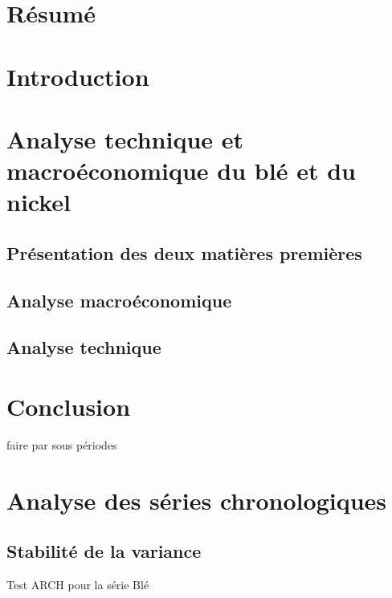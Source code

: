 \documentclass[12pt,a4paper]{article}
\begin{document}
\clearpage
{}
\pagestyle{fancy}
\fancyhead{}\fancyfoot[C]{\thepage}
\section*{Résumé}
\setcounter{tocdepth}{6}
\renewcommand\contentsname{Sommaire}
\tableofcontents



\section*{Introduction}
\section{Analyse technique et macroéconomique du blé et du nickel}
\subsection{Présentation des deux matières premières}
\subsection{Analyse macroéconomique}
\subsection{Analyse technique}





\section*{Conclusion}


faire par sous périodes


\appendix
\renewcommand{\thetable}{\thesection.\arabic{table}}
\renewcommand{\thefigure}{\thesection.\arabic{figure}}
\section{Analyse des séries chronologiques}
\setcounter{table}{0}
\setcounter{figure}{0}
\subsection{Stabilité de la variance}\label{appendix:hetero}
\begin{table}[H]
    \centering
    \caption{Test ARCH pour la série Blé}
    \sffamily
    \label{tab:hetero_ble}
    
\end{table}
\end{document}
